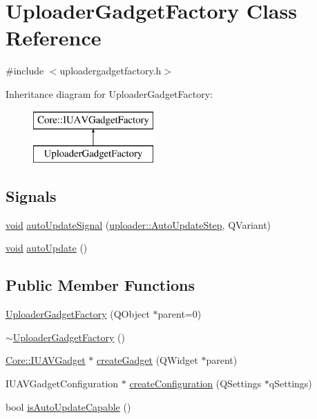 \hypertarget{class_uploader_gadget_factory}{\section{\-Uploader\-Gadget\-Factory \-Class \-Reference}
\label{class_uploader_gadget_factory}
}


{\ttfamily \#include $<$uploadergadgetfactory.\-h$>$}

\-Inheritance diagram for \-Uploader\-Gadget\-Factory\-:\begin{figure}[H]
\begin{center}
\leavevmode
\includegraphics[height=2.000000cm]{class_uploader_gadget_factory}
\end{center}
\end{figure}
\subsection*{\-Signals}
\begin{DoxyCompactItemize}
\item 
\hyperlink{group___u_a_v_objects_plugin_ga444cf2ff3f0ecbe028adce838d373f5c}{void} \hyperlink{group___y_modem_uploader_ga1db019129aec5db54cea977a3628092e}{auto\-Update\-Signal} (\hyperlink{namespaceuploader_adb90c08cc33a348c2363c1d7a9626422}{uploader\-::\-Auto\-Update\-Step}, \-Q\-Variant)
\item 
\hyperlink{group___u_a_v_objects_plugin_ga444cf2ff3f0ecbe028adce838d373f5c}{void} \hyperlink{group___y_modem_uploader_gaf1635d4877cd9ffd1933c45884278845}{auto\-Update} ()
\end{DoxyCompactItemize}
\subsection*{\-Public \-Member \-Functions}
\begin{DoxyCompactItemize}
\item 
\hyperlink{group___y_modem_uploader_ga33e544ad20fa638bbf34e7a461d3306e}{\-Uploader\-Gadget\-Factory} (\-Q\-Object $\ast$parent=0)
\item 
\hyperlink{group___y_modem_uploader_ga7509287bf0bfbf3b364591ac90155886}{$\sim$\-Uploader\-Gadget\-Factory} ()
\item 
\hyperlink{class_core_1_1_i_u_a_v_gadget}{\-Core\-::\-I\-U\-A\-V\-Gadget} $\ast$ \hyperlink{group___y_modem_uploader_gaec0b67dc3c2b6c12df29c01be93457fb}{create\-Gadget} (\-Q\-Widget $\ast$parent)
\item 
\-I\-U\-A\-V\-Gadget\-Configuration $\ast$ \hyperlink{group___y_modem_uploader_gada950b4297da08d576452a67d7c42f59}{create\-Configuration} (\-Q\-Settings $\ast$q\-Settings)
\item 
bool \hyperlink{group___y_modem_uploader_ga1c32bfa644ec01ae5f98410b24c7f6fd}{is\-Auto\-Update\-Capable} ()
\end{DoxyCompactItemize}


